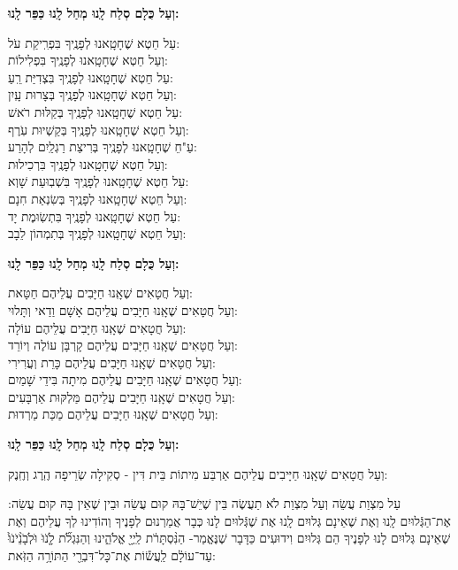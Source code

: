 \documentclass[twoside, openany, parskip=half, 11pt]{book}
\begin{document}
\begin{mdframed}[innerrightmargin=40pt,linecolor=white]
\textbf{וְעַל כֻּלָם סְלַח לָֽנוּ מְחַל לָֽנוּ כַּפֵּר לָֽנוּ:}

עַל חֵטְא שֶׁחָטָֽאנוּ לְפָנֶֽיךָ בִּפְרִֽיקַת עֹל:\\ 	וְעַל חֵטְא שֶׁחָטָֽאנוּ לְפָנֶֽיךָ בִּפְלִילוֹת:	\\
עַל חֵטְא שֶׁחָטָֽאנוּ לְפָנֶֽיךָ בִּצְדִיַּת רֵֽעַ: \\	וְעַל חֵטְא שֶׁחָטָֽאנוּ לְפָנֶֽיךָ בְּצָרוּת עָֽיִן:	\\
עַל חֵטְא שֶׁחָטָֽאנוּ לְפָנֶֽיךָ בְּקַלּוּת רֹאשׁ:\\	וְעַל חֵטְא שֶׁחָטָֽאנוּ לְפָנֶֽיךָ בְּקַשְׁיוּת עֹֽרֶף:	\\
עַ"חֵ שֶׁחָטָֽאנוּ לְפָנֶֽיךָ בְּרִיצַת רַגְלַֽיִם לְהָרַע:\\	וְעַל חֵטְא שֶׁחָטָֽאנוּ לְפָנֶֽיךָ בִּרְכִילוּת:	\\
עַל חֵטְא שֶׁחָטָֽאנוּ לְפָנֶֽיךָ בִּשְׁבֽוּעַת שָׁוְא: \\	וְעַל חֵטְא שֶׁחָטָֽאנוּ לְפָנֶֽיךָ בְּשִׂנְאַת חִנָם:	\\
עַל חֵטְא שֶׁחָטָֽאנוּ לְפָנֶֽיךָ בִּתְשֽׂוּמֶת יָד:\\ 	וְעַל חֵטְא שֶׁחָטָֽאנוּ לְפָנֶֽיךָ בְּתִמְהוֹן לֵבָב:

\textbf{וְעַל כֻּלָם סְלַח לָֽנוּ מְחַל לָֽנוּ כַּפֵּר לָֽנוּ:}


	וְעַל חֲטָאִים שֶׁאָֽנוּ חַיָּבִים עֲלֵיהֶם חַטָּאת:\\
	וְעַל חֲטָאִים שֶׁאָֽנוּ חַיָּבִים עֲלֵיהֶם אָשָׁם וַדַאי וְתָּלוּי:\\
	וְעַל חֲטָאִים שֶׁאָֽנוּ חַיָּבִים עֲלֵיהֶם עוֹלָה:\\
	וְעַל חֲטָאִים שֶׁאָֽנוּ חַיָּבִים עֲלֵיהֶם קָרְבָּן עוֹלֶה וְיוֹרֵד:\\
		וְעַל חֲטָאִים שֶׁאָֽנוּ חַיָּבִים עֲלֵיהֶם כָּרֵת וְעֲרִירִי:\\
		וְעַל חֲטָאִים שֶׁאָֽנוּ חַיָּבִים עֲלֵיהֶם מִיתָה בִּידֵי שָׁמַיִם:\\
			וְעַל חֲטָאִים שֶׁאָֽנוּ חַיָּבִים עֲלֵיהֶם מַּלְקּוּת אַרְבָּעִים:\\
				וְעַל חֲטָאִים שֶׁאָֽנוּ חַיָּבִים עֲלֵיהֶם מַכַּת מַרְדוּת:

\end{mdframed}

\textbf{וְעַל כֻּלָם סְלַח לָֽנוּ מְחַל לָֽנוּ כַּפֵּר לָֽנוּ:}

וְעַל חֲטָאִים שֶׁאָֽנוּ חַיָּיבִים עֲלֵיהֶם אַרְבַּע מִיתוֹת בֵּית דִּין - סְקִילָה שְׂרֵיפָה הֶֽרֶג וְחֶֽנֶק:

עַל מִצְוַת עֲשֵׂה וְעַל מִצְוַת לֹא תַעֲשֶׂה בֵּין שֶׁיֵשׁ־בָּהּ קוּם עֲשֵׂה וּבֵין שֶׁאֵין בָּהּ קוּם עֲשֵׂה: אֶת־הַגְּֿלוּיִם לָֽנוּ וְאֶת שֶׁאֵינָם גְּלוּיִם לָֽנוּ אֶת שֶׁגְּֿלוּיִם לָנוּ כְּבָר אֲמַרְנוּם לְפָנֶיךָ וְהוֹדִינוּ לְךָ עֲלֵיהֶם וְאֶת שֶׁאֵינָם גְּלוּיִם לָנוּ לְפָנֶיךָ הֵם גְּלוּיִם וִידוּעִים כַּדָּבָר שֶׁנֶּאֱמַר- הַנִּ֨סְתָּרֹ֔ת לַֽיְיָ֖ אֱלֹהֵ֑ינוּ וְהַנִּגְלֹ֞ת לָֹ֤נֹוֹּ וֹּלְֹבָֹנֵֹ֨יֹנֹוֹּ֙ עַד־עוֹלָ֔ם לַֽעֲשׂ֕וֹת אֶת־כָּל־דִּבְרֵ֖י הַתּוֹרָ֥ה הַזֹּֽאת:
\end{document}
